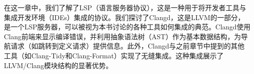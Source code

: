 
在这一章中，我们了解了LSP（语言服务器协议），这是一种用于将开发者工具与集成开发环境（IDEs）集成的协议。我们探讨了Clangd，这是LLVM的一部分，是一个LSP服务器，可以被视为本书讨论的各种工具如何集成的典范。Clangd使用Clang前端来显示编译错误，并利用抽象语法树（AST）作为基本数据结构，为导航请求（如跳转到定义请求）提供信息。此外，Clangd与之前章节中提到的其他工具（如Clang-Tidy和Clang-Format）实现了无缝集成。这种集成展示了LLVM/Clang模块结构的显著优势。
